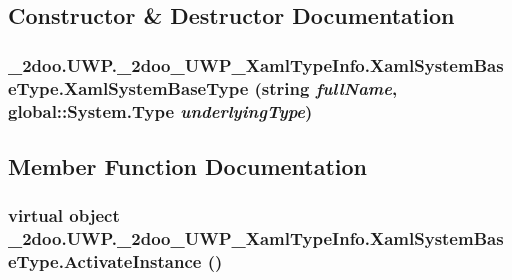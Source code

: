\subsection{Constructor \& Destructor Documentation}
\hypertarget{class__2doo_1_1_u_w_p_1_1__2doo___u_w_p___xaml_type_info_1_1_xaml_system_base_type_fa9a05a64a5b533a1c43f609807c88e1}{
\subsubsection[{XamlSystemBaseType}]{\setlength{\rightskip}{0pt plus 5cm}\_\-2doo.UWP.\_\-2doo\_\-UWP\_\-XamlTypeInfo.XamlSystemBaseType.XamlSystemBaseType (string {\em fullName}, \/  global::System.Type {\em underlyingType})}}
\label{class__2doo_1_1_u_w_p_1_1__2doo___u_w_p___xaml_type_info_1_1_xaml_system_base_type_fa9a05a64a5b533a1c43f609807c88e1}




\subsection{Member Function Documentation}
\hypertarget{class__2doo_1_1_u_w_p_1_1__2doo___u_w_p___xaml_type_info_1_1_xaml_system_base_type_cd2c7ef4900b02bd05eb8cb9999b9c58}{
\subsubsection[{ActivateInstance}]{\setlength{\rightskip}{0pt plus 5cm}virtual object \_\-2doo.UWP.\_\-2doo\_\-UWP\_\-XamlTypeInfo.XamlSystemBaseType.ActivateInstance ()}}
\label{class__2doo_1_1_u_w_p_1_1__2doo___u_w_p___xaml_type_info_1_1_xaml_system_base_type_cd2c7ef4900b02bd05eb8cb9999b9c58}


